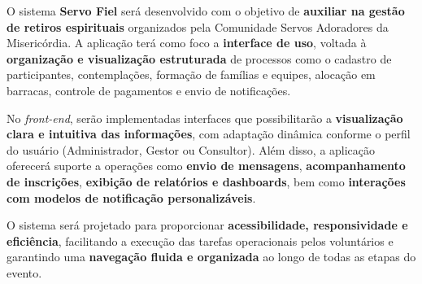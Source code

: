 O sistema \textbf{Servo Fiel} será desenvolvido com o objetivo de \textbf{auxiliar na gestão de retiros espirituais} organizados pela Comunidade Servos Adoradores da Misericórdia. A aplicação terá como foco a \textbf{interface de uso}, voltada à \textbf{organização e visualização estruturada} de processos como o cadastro de participantes, contemplações, formação de famílias e equipes, alocação em barracas, controle de pagamentos e envio de notificações.

No \textit{front-end}, serão implementadas interfaces que possibilitarão a \textbf{visualização clara e intuitiva das informações}, com adaptação dinâmica conforme o perfil do usuário (Administrador, Gestor ou Consultor). Além disso, a aplicação oferecerá suporte a operações como \textbf{envio de mensagens}, \textbf{acompanhamento de inscrições}, \textbf{exibição de relatórios e dashboards}, bem como \textbf{interações com modelos de notificação personalizáveis}.

O sistema será projetado para proporcionar \textbf{acessibilidade, responsividade e eficiência}, facilitando a execução das tarefas operacionais pelos voluntários e garantindo uma \textbf{navegação fluida e organizada} ao longo de todas as etapas do evento.
